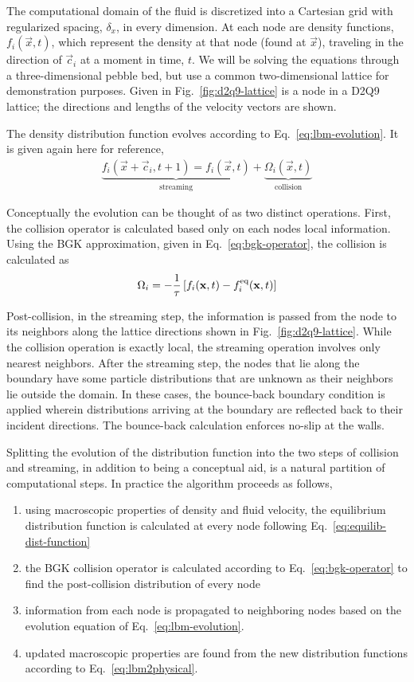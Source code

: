 The computational domain of the fluid is discretized into a Cartesian grid with regularized spacing, $\delta_x$, in every dimension. At each node are density functions, $f_i(\vec{x},t)$, which represent the density at that node (found at $\vec{x}$), traveling in the direction of $\vec{c}_i$ at a moment in time, $t$. We will be solving the equations through a three-dimensional pebble bed, but use a common two-dimensional lattice for demonstration purposes. Given in Fig.~\ref{fig:d2q9-lattice} is a node in a D2Q9 lattice; the directions and lengths of the velocity vectors are shown.

The density distribution function evolves according to Eq.~\ref{eq:lbm-evolution}. It is given again here for reference,
\begin{align}
	\underbrace{f_i(\vec{x}+\vec{c}_i, t + 1)  = f_i(\vec{x},t)}_\text{streaming}  + \underbrace{\Omega_i(\vec{x},t)}_\text{collision}
\end{align}

Conceptually the evolution can be thought of as two distinct operations. First, the collision operator is calculated based only on each nodes local information. Using the BGK approximation, given in Eq.~\ref{eq:bgk-operator}, the collision is calculated as
\begin{align}
	\Omega_i = -\frac{1}{\tau}\left[f_i(\mathbf{x},t) - f_i^{\text{eq}}(\mathbf{x},t)\right]
\end{align}

Post-collision, in the streaming step, the information is passed from the node to its neighbors along the lattice directions shown in Fig.~\ref{fig:d2q9-lattice}. While the collision operation is exactly local, the streaming operation involves only nearest neighbors. After the streaming step, the nodes that lie along the boundary have some particle distributions that are unknown as their neighbors lie outside the domain. In these cases, the bounce-back boundary condition is applied wherein distributions arriving at the boundary are reflected back to their incident directions. The bounce-back calculation enforces no-slip at the walls.

Splitting the evolution of the distribution function into the two steps of collision and streaming, in addition to being a conceptual aid, is a natural partition of computational steps. In practice the algorithm proceeds as follows,\cite{Viggen2009}
\begin{enumerate}
	\item{using macroscopic properties of density and fluid velocity, the equilibrium distribution function is calculated at every node following Eq.~\ref{eq:equilib-dist-function}}
	\item{the BGK collision operator is calculated according to Eq.~\ref{eq:bgk-operator} to find the post-collision distribution of every node}
	\item{information from each node is propagated to neighboring nodes based on the evolution equation of Eq.~\ref{eq:lbm-evolution}.}
	\item{updated macroscopic properties are found from the new distribution functions according to Eq.~\ref{eq:lbm2physical}.}
\end{enumerate}


